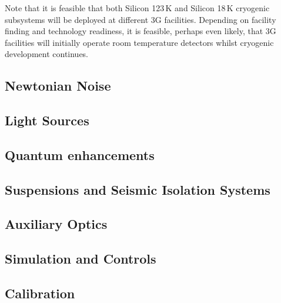 Note that it is feasible that both Silicon 123\,K and Silicon 18\,K cryogenic subsystems will be deployed at different 3G facilities.  Depending on facility finding and  technology readiness, it is  feasible, perhaps even likely,  that 3G facilities will initially operate room temperature detectors whilst cryogenic development continues.

\subsection{Newtonian Noise}

\subsection{Light Sources}
\subsection{Quantum enhancements}
\subsection{Suspensions and Seismic Isolation Systems}
\subsection{Auxiliary Optics}
\subsection{Simulation and Controls}
\subsection{Calibration}


